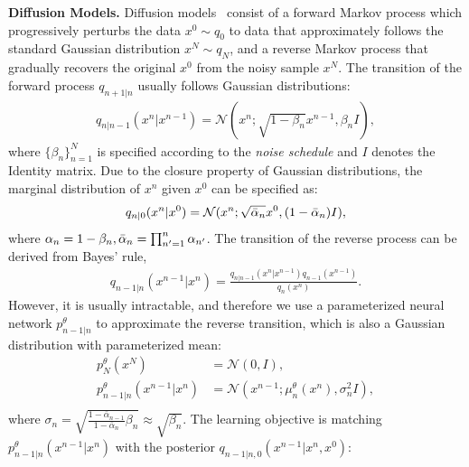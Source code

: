\textbf{Diffusion Models. }Diffusion models~\citep{ddpm,diffusion_sde} consist of a forward Markov process which progressively perturbs the data $x^0\sim q_0$ to data that approximately follows the standard Gaussian distribution $x^N\sim q_N$, and a reverse Markov process that gradually recovers the original $x^0$ from the noisy sample $x^N$. The transition of the forward process $q_{n+1|n}$ usually follows Gaussian distributions:
\begin{equation}
    \begin{aligned}
        q_{n|n-1}(x^{n}|x^{n-1})=\mathcal{N}(x^{n}; \sqrt{1-\beta_{n}}x^{n-1}, \beta_{n}I),
    \end{aligned}
\end{equation}
where $\{\beta_{n}\}_{n=1}^N$ is specified according to the \textit{noise schedule} and $I$ denotes the Identity matrix. Due to the closure property of Gaussian distributions, the marginal distribution of $x^n$ given $x^0$ can be specified as:
\begin{equation}
    \begin{aligned}
        q_{n|0}(x^n|x^0)=\mathcal{N}(x^n; \sqrt{\bar{\alpha}_n}x^0, (1-\bar{\alpha}_n)I),
    \end{aligned}
\end{equation}
where $\alpha_n=1-\beta_n, \bar{\alpha}_n=\prod_{n'=1}^n \alpha_{n'}$. The transition of the reverse process can be derived from Bayes' rule, 
\begin{equation}
    \begin{aligned}
        q_{n-1|n}(x^{n-1}|x^{n})=\frac{q_{n|n-1}(x^{n}|x^{n-1})q_{n-1}(x^{n-1})}{q_{n}(x^{n})}.
    \end{aligned}
\end{equation}
However, it is usually intractable, and therefore we use a parameterized neural network $p^\theta_{n-1|n}$ to approximate the reverse transition, which is also a Gaussian distribution with parameterized mean:
\begin{equation}\label{eq:reverse_diff}
    \begin{aligned}
        p^\theta_N(x^N)&=\mathcal{N}(0, I),\\
        p^\theta_{n-1|n}(x^{n-1}|x^{n})&=\mathcal{N}(x^{n-1}; \mu^\theta_{n}(x^{n}), \sigma^2_{n}I),\\
    \end{aligned}
\end{equation}
where $\sigma_n=\sqrt{\frac{1-\bar{\alpha}_{n-1}}{1-\bar{\alpha}_n}\beta_n}\approx \sqrt{\beta_n}$. The learning objective is matching $p^\theta_{n-1|n}(x^{n-1}|x^{n})$ with the posterior $q_{n-1|n,0}(x^{n-1}|x^{n},x^0)$:

